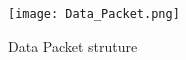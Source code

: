 			\begin{figure}[!ht]
				\texttt{[image: Data\_Packet.png]}
				\caption{Data Packet struture}
			\label{fig:Data_Packet}
			\end{figure}

